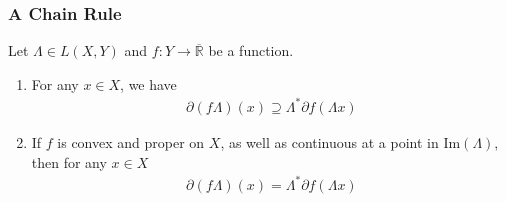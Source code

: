 \documentclass[10pt, hyperref={hidelinks}]{beamer}
\begin{document}
    \begin{frame}
        \frametitle{A Chain Rule}

        \pause
        \begin{theorem}
            Let \(\Lambda \in L(X, Y)\) and \(f\colon Y \to \overline{\mathbb{R}}\) be a function.
            \pause
            \begin{enumerate}[label=(\roman*), wide]
                \item \label{compat_with_operator_theorem_1} For any \(x \in X\), we have
                \begin{align*}
                    \partial (f\Lambda)(x) \supseteq \Lambda^*\partial f(\Lambda x)
                \end{align*}
                \pause
                \item \label{compat_with_operator_theorem_2} If \(f\) is convex and proper on \(X\), as well as continuous at a point in \(\text{Im}(\Lambda)\), then for any \(x \in X\)
                \begin{align*}
                    \partial (f\Lambda)(x) = \Lambda^*\partial f(\Lambda x) \label{compat_with_operator_theorem_eq_2}
                \end{align*}
            \end{enumerate}
        \end{theorem}
        \pause
        \begin{figure}[!hbtp]
        \end{figure}
    \end{frame}
\end{document}
